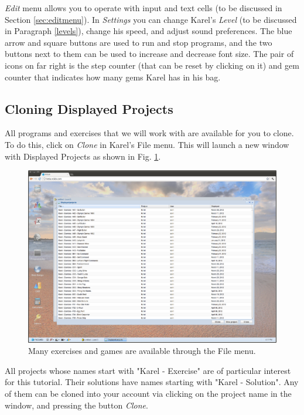{\em Edit} menu allows you to operate with input and text cells (to be discussed in 
Section \ref{sec:editmenu}). In {\em Settings} you can change Karel's {\em Level} (to be discussed
in Paragraph \ref{levels}), change his speed, and adjust sound preferences. The blue arrow and square 
buttons are used to run and stop programs, and the two buttons next to them can be used to increase and decrease 
font size. The pair of icons on far right is the step counter (that can be reset by clicking on it) and 
gem counter that indicates how many gems Karel has in his bag.

\subsection{Cloning Displayed Projects} \label{cloning}

All programs and exercises that we will work with are available for you to clone. 
To do this, click on {\em Clone} in Karel's File menu. This will launch a new window 
with Displayed Projects as shown in Fig. \ref{fig:cloning}.

\begin{figure}[!ht]
\begin{center}
\includegraphics[width=\textwidth]{imgk/cloning.png}
\end{center}
\caption{Many exercises and games are available through the File menu.}
\label{fig:cloning}
\end{figure}
\newpage
\noindent
All projects whose names start with "Karel - Exercise" are of particular interest 
for this tutorial. Their solutions have names starting with "Karel - Solution". 
Any of them can be cloned into your account via clicking on the project name in the window, 
and pressing the button {\em Clone}.

